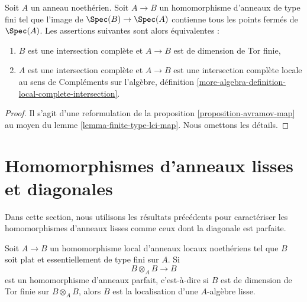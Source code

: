 \begin{lemma}
\label{lemma-avramov-map-finite-type}
Soit $A$ un anneau noethérien. Soit $A \to B$ un homomorphisme d'anneaux de
type fini tel que l'image de $\Spec(B) \to\Spec(A)$ contienne tous les
points fermés de $\Spec(A)$. Les assertions suivantes sont alors équivalentes :
\begin{enumerate}
\item $B$ est une intersection complète et $A \to B$ est de
dimension de Tor finie,
\item $A$ est une intersection complète et $A \to B$ est une intersection
complète locale au sens de Compléments sur l'algèbre, définition
\ref{more-algebra-definition-local-complete-intersection}.
\end{enumerate}
\end{lemma}

\begin{proof}
Il s'agit d'une reformulation de la proposition \ref{proposition-avramov-map} au
moyen du lemme \ref{lemma-finite-type-lci-map}.
Nous omettons les détails.
\end{proof}








\section{Homomorphismes d'anneaux lisses et diagonales}
\label{section-smooth-diagonal-perfect}

\noindent
Dans cette section, nous utilisons les résultats précédents pour caractériser les homomorphismes d'anneaux
lisses comme ceux dont la diagonale est parfaite.

\begin{lemma}
\label{lemma-local-perfect-diagonal}
Soit $A \to B$ un homomorphisme local d'anneaux locaux noethériens tel que
$B$ soit plat et essentiellement de type fini sur $A$. Si
$$
B \otimes_A B \longrightarrow B
$$
est un homomorphisme d'anneaux parfait, c'est-à-dire si $B$ est de dimension de Tor finie sur
$B \otimes_A B$, alors $B$ est la localisation d'une $A$-algèbre lisse.
\end{lemma}

